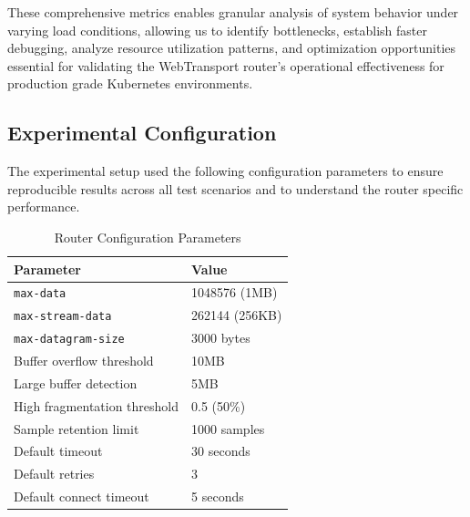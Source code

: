 These comprehensive metrics enables granular analysis of system behavior under varying load conditions, allowing us to identify bottlenecks, establish faster debugging, analyze resource utilization patterns, and optimization opportunities essential for validating the WebTransport router’s operational effectiveness for production grade Kubernetes environments.


\subsection{Experimental Configuration}
The experimental setup used the following configuration parameters to ensure reproducible results across all test scenarios and to understand the router specific performance.

\begin{table}[h!]
\centering
\caption{Router Configuration Parameters}
\label{tab:router-config}
\renewcommand{\arraystretch}{1.3} %
\begin{tabular}{|l|l|}
\hline
\textbf{Parameter} & \textbf{Value} \\
\hline
\texttt{max-data} & 1048576 (1MB) \\
\hline
\texttt{max-stream-data} & 262144 (256KB) \\
\hline
\texttt{max-datagram-size} & 3000 bytes\\
\hline
Buffer overflow threshold & 10MB\\
\hline
Large buffer detection & 5MB \\
\hline
High fragmentation threshold & 0.5 (50\%) \\
\hline
Sample retention limit & 1000 samples \\
\hline
Default timeout & 30 seconds  \\
\hline
Default retries & 3 \\
\hline
Default connect timeout & 5 seconds \\
\hline
\end{tabular}
\end{table}

